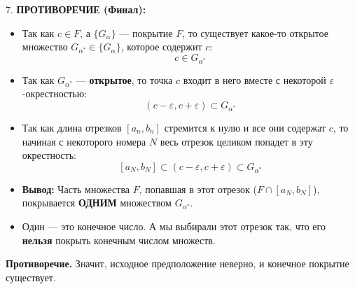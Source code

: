 \begin{tcolorbox}[title=Доказательство (Метод вложенных отрезков)]
    7. \textbf{ПРОТИВОРЕЧИЕ (Финал):}
    \begin{itemize}
        \item Так как $c \in F$, а $\{G_\alpha\}$ — покрытие $F$, то существует какое-то открытое множество $G_{\alpha^*} \in \{G_\alpha\}$, которое содержит $c$:
        \[ c \in G_{\alpha^*} \]
        \item Так как $G_{\alpha^*}$ — \textbf{открытое}, то точка $c$ входит в него вместе с некоторой $\varepsilon$-окрестностью:
        \[ (c - \varepsilon, c + \varepsilon) \subset G_{\alpha^*} \]
        \item Так как длина отрезков $[a_n, b_n]$ стремится к нулю и все они содержат $c$, то начиная с некоторого номера $N$ весь отрезок целиком попадет в эту окрестность:
        \[ [a_N, b_N] \subset (c - \varepsilon, c + \varepsilon) \subset G_{\alpha^*} \]
        \item \textbf{Вывод:} Часть множества $F$, попавшая в этот отрезок ($F \cap [a_N, b_N]$), покрывается \textbf{ОДНИМ} множеством $G_{\alpha^*}$.
        \item Один — это конечное число. А мы выбирали этот отрезок так, что его \textbf{нельзя} покрыть конечным числом множеств.
    \end{itemize}
    \textbf{Противоречие.} Значит, исходное предположение неверно, и конечное покрытие существует.
\end{tcolorbox}
